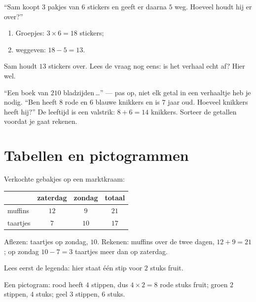 \begin{example}\label{ex:g2:problems:twostep}
``Sam koopt $3$ pakjes van $6$ stickers en geeft er daarna $5$ weg.
Hoeveel houdt hij er over?''
\begin{enumerate}
  \item Groepjes: $3 \times 6 = 18$ stickers;
  \item weggeven: $18 - 5 = 13$.
\end{enumerate}
Sam houdt $13$ stickers over. Lees de vraag nog eens: is het verhaal
echt af? Hier wel.
\end{example}

\begin{example}\label{ex:g2:problems:extra}
``Een boek van $210$ bladzijden\,\dots'' --- pas op, niet elk getal in
een verhaaltje heb je nodig. ``Ben heeft $8$ rode en $6$ blauwe
knikkers en is $7$ jaar oud. Hoeveel knikkers heeft hij?'' De leeftijd
is een valstrik: $8 + 6 = 14$ knikkers. Sorteer de getallen voordat je
gaat rekenen.
\end{example}

\section{Tabellen en pictogrammen}

\begin{example}\label{ex:g2:problems:table}
Verkochte gebakjes op een marktkraam:
\begin{center}
\renewcommand{\arraystretch}{1.3}
\begin{tabular}{l|ccc}
 & zaterdag & zondag & totaal \\
\hline
muffins & $12$ & $9$ & $21$ \\
taartjes & $7$ & $10$ & $17$ \\
\end{tabular}
\end{center}
Aflezen: taartjes op zondag, $10$. Rekenen: muffins over de twee dagen,
$12 + 9 = 21$; op zondag $10 - 7 = 3$ taartjes meer dan op zaterdag.
\end{example}

\begin{example}\label{ex:g2:problems:pictogram}
Lees eerst de legenda: hier staat één stip voor $2$ stuks fruit.

\begin{omfigure}

{\small Een pictogram: rood heeft $4$ stippen, dus $4 \times 2 = 8$
rode stuks fruit; groen $2$ stippen, $4$ stuks; geel $3$ stippen, $6$
stuks.}
\end{omfigure}
\end{example}

